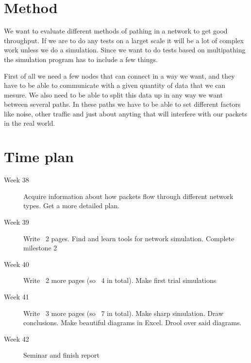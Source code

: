 \documentclass[11pt,twocolumn]{article}
\begin{document}
\section{Method}

We want to evaluate different methods of pathing in a network to get good throughput. If we are to do any tests on a larget scale it will be a lot of complex work unless we do a simulation. Since we want to do tests based on multipathing the simulation program has to include a few things. 

First of all we need a few nodes that can connect in a way we want, and they have to be able to communicate with a given quantity of data that we can mesure. We also need to be able to split this data up in any way we want between several paths. In these paths we have to be able to set different factors like noise, other traffic and just about anyting that will interfere with our packets in the real world.

\section{Time plan}
\begin{description}
\item[Week 38]
Acquire information about how packets flow through different network types. Get a more detailed plan.
\item[Week 39]
Write ~2 pages. Find and learn tools for network simulation. Complete milestone 2
\item[Week 40]
Write ~2 more pages (so ~4 in total). Make first trial simulations
\item[Week 41]
Write ~3 more pages (so ~7 in total). Make sharp simulation. Draw conclusions. Make beautiful diagrams in Excel. Drool over said diagrams.
\item[Week 42]
Seminar and finish report
\end{description}
\end{document}
